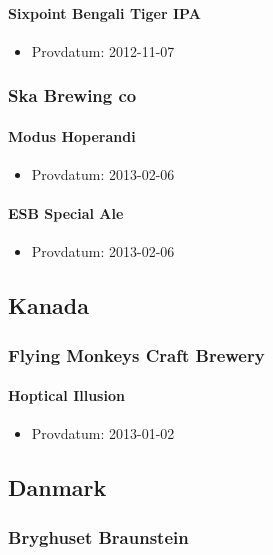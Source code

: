 \documentclass[11pt]{article}
\begin{document}
\paragraph{Sixpoint Bengali Tiger IPA}
\label{sec:org8989afc}
\begin{itemize}
\item Provdatum: 2012-11-07
\end{itemize}
\subsubsection{Ska Brewing co}
\label{sec:orgaf757cd}
\paragraph{Modus Hoperandi}
\label{sec:org0d879be}
\begin{itemize}
\item Provdatum: 2013-02-06
\end{itemize}
\paragraph{ESB Special Ale}
\label{sec:org05a5c76}
\begin{itemize}
\item Provdatum: 2013-02-06
\end{itemize}
\subsection{Kanada}
\label{sec:org4cc0ef4}
\subsubsection{Flying Monkeys Craft Brewery}
\label{sec:org41a92cb}
\paragraph{Hoptical Illusion}
\label{sec:org68014c2}
\begin{itemize}
\item Provdatum: 2013-01-02
\end{itemize}
\subsection{Danmark}
\label{sec:orga141780}
\subsubsection{Bryghuset Braunstein}
\label{sec:org526576c}
\end{document}
